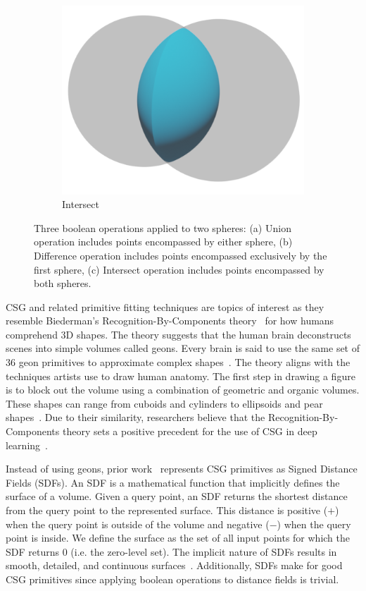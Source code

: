 \begin{figure}
\begin{subfigure}[t]{0.3\textwidth}
		\includegraphics[width=\textwidth]{Images/Intersect}
		\caption{Intersect}
	\end{subfigure}
	\caption{Three boolean operations applied to two spheres: (a) Union operation includes points encompassed by either sphere, (b) Difference operation includes points encompassed exclusively by the first sphere, (c) Intersect operation includes points encompassed by both spheres.}
	\label{fig:boolean operations}
\end{figure}

CSG and related primitive fitting techniques are topics of interest as they resemble Biederman's Recognition-By-Components theory~\cite{Biederman1987} for how humans comprehend 3D shapes. The theory suggests that the human brain deconstructs scenes into simple volumes called geons. Every brain is said to use the same set of 36 geon primitives to approximate complex shapes~\cite{Biederman1987}. The theory aligns with the techniques artists use to draw human anatomy. The first step in drawing a figure is to block out the volume using a combination of geometric and organic volumes. These shapes can range from cuboids and cylinders to ellipsoids and pear shapes~\cite{Winslow2015}. Due to their similarity, researchers believe that the Recognition-By-Components theory sets a positive precedent for the use of CSG in deep learning~\cite{Sharma2018}.

Instead of using geons, prior work~\cite{Sharma2018, Kania2020, Ren2021} represents CSG primitives as Signed Distance Fields (SDFs). An SDF is a mathematical function that implicitly defines the surface of a volume. Given a query point, an SDF returns the shortest distance from the query point to the represented surface. This distance is positive ($+$) when the query point is outside of the volume and negative ($-$) when the query point is inside. We define the surface as the set of all input points for which the SDF returns 0 (i.e. the zero-level set). The implicit nature of SDFs results in smooth, detailed, and continuous surfaces~\cite{Park2019}. Additionally, SDFs make for good CSG primitives since applying boolean operations to distance fields is trivial.

